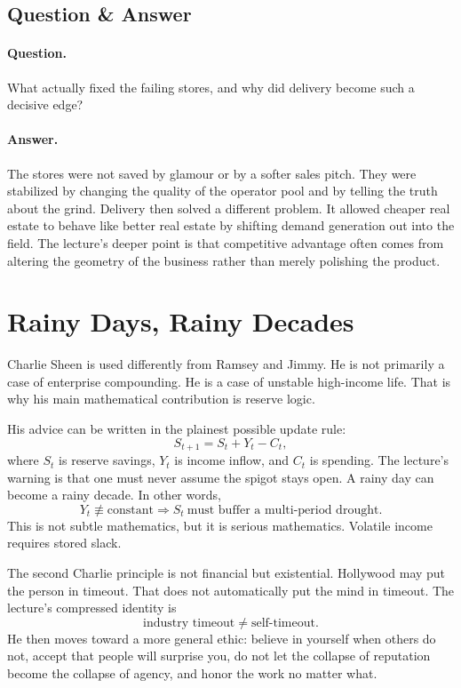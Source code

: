 \subsection{Question \& Answer}

\paragraph{Question.} What actually fixed the failing stores, and why did delivery become such a decisive edge?

\paragraph{Answer.} The stores were not saved by glamour or by a softer sales pitch. They were stabilized by changing the quality of the operator pool and by telling the truth about the grind. Delivery then solved a different problem. It allowed cheaper real estate to behave like better real estate by shifting demand generation out into the field. The lecture's deeper point is that competitive advantage often comes from altering the geometry of the business rather than merely polishing the product.

\section{Rainy Days, Rainy Decades}

Charlie Sheen is used differently from Ramsey and Jimmy. He is not primarily a case of enterprise compounding. He is a case of unstable high-income life. That is why his main mathematical contribution is reserve logic.

His advice can be written in the plainest possible update rule:
\begin{equation}
S_{t+1}=S_t+Y_t-C_t,
\end{equation}
where \(S_t\) is reserve savings, \(Y_t\) is income inflow, and \(C_t\) is spending. The lecture's warning is that one must never assume the spigot stays open. A rainy day can become a rainy decade. In other words,
\begin{equation}
Y_t \not\equiv \text{constant} \Rightarrow S_t\ \text{must buffer a multi-period drought}.
\end{equation}
This is not subtle mathematics, but it is serious mathematics. Volatile income requires stored slack.

The second Charlie principle is not financial but existential. Hollywood may put the person in timeout. That does not automatically put the mind in timeout. The lecture's compressed identity is
\begin{equation}
\text{industry timeout} \neq \text{self-timeout}.
\end{equation}
He then moves toward a more general ethic: believe in yourself when others do not, accept that people will surprise you, do not let the collapse of reputation become the collapse of agency, and honor the work no matter what.

